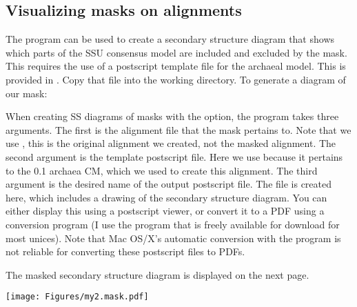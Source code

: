 \subsection{Visualizing masks on alignments}

The  program can be used to create a secondary
structure diagram that shows which parts of the SSU consensus model
are included and excluded by the mask. This requires the use of a
postscript template file for the archaeal model. This is provided in 
. Copy
that file into the working directory. To generate a diagram of our
mask: 


When creating SS diagrams of masks with the  option,
the  program takes three arguments. The first is the
alignment file that the mask pertains to. Note that we use
, this is the original alignment we created,
not the masked alignment. The second argument is the template
postscript file. Here we use  because it pertains
to the  0.1 archaea CM, which we used to create this
alignment. The third argument is the desired name of the output
postscript file. The  file is created here, which
includes a drawing of the secondary structure diagram. You can either
display this using a postscript viewer, or convert it to a PDF using a
conversion program (I use the  program that is freely
available for download for most unices). Note that Mac OS/X's
automatic conversion with the  program is not reliable
for converting these postscript files to PDFs. 

The masked secondary structure diagram is displayed on the next page.

\newpage

\texttt{[image: Figures/my2.mask.pdf]}













